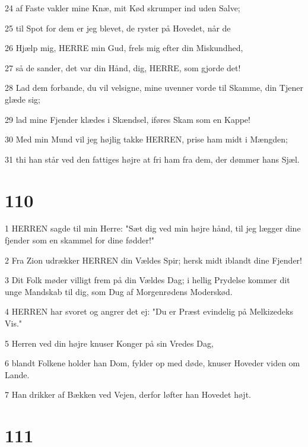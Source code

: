 \par 24 af Faste vakler mine Knæ, mit Kød skrumper ind uden Salve;
\par 25 til Spot for dem er jeg blevet, de ryster på Hovedet, når de
\par 26 Hjælp mig, HERRE min Gud, frels mig efter din Miskundhed,
\par 27 så de sander, det var din Hånd, dig, HERRE, som gjorde det!
\par 28 Lad dem forbande, du vil velsigne, mine uvenner vorde til Skamme, din Tjener glæde sig;
\par 29 lad mine Fjender klædes i Skændsel, iføres Skam som en Kappe!
\par 30 Med min Mund vil jeg højlig takke HERREN, prise ham midt i Mængden;
\par 31 thi han står ved den fattiges højre at fri ham fra dem, der dømmer hans Sjæl.

\chapter{110}

\par 1 HERREN sagde til min Herre: "Sæt dig ved min højre hånd, til jeg lægger dine fjender som en skammel for dine fødder!"
\par 2 Fra Zion udrækker HERREN din Vældes Spir; hersk midt iblandt dine Fjender!
\par 3 Dit Folk møder villigt frem på din Vældes Dag; i hellig Prydelse kommer dit unge Mandskab til dig, som Dug af Morgenrødens Moderskød.
\par 4 HERREN har svoret og angrer det ej: "Du er Præst evindelig på Melkizedeks Vis."
\par 5 Herren ved din højre knuser Konger på sin Vredes Dag,
\par 6 blandt Folkene holder han Dom, fylder op med døde, knuser Hoveder viden om Lande.
\par 7 Han drikker af Bækken ved Vejen, derfor løfter han Hovedet højt.

\chapter{111}

